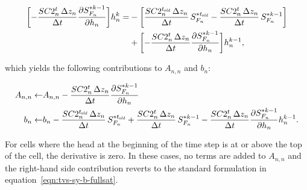 \begin{equation}
	\label{eqn:tvs-sy-nr}
	\begin{aligned}
		\biggl[ - \frac{SC2_n^t \, \Delta z_n}{\Delta t} \frac{\partial S_{F_n}^{\ast k-1}}{\partial h_n} \biggr] h_n^k =
		& - \biggl[ \frac{SC2_n^{t_\mathit{\kern -0.07em old}} \, \Delta z_n}{\Delta t} \, S_{F_n}^{\ast t_\mathit{\kern -0.07em old}} - \frac{SC2_n^t \, \Delta z_n}{\Delta t} \, S_{F_n}^{\ast k-1} \biggr] \\
		& + \biggl[ - \frac{SC2_n^t \, \Delta z_n}{\Delta t} \frac{\partial S_{F_n}^{\ast k-1}}{\partial h_n} \biggr] h_n^{k-1} ,
	\end{aligned}
\end{equation}

\noindent which yields the following contributions to $A_{n,n}$ and $b_n$:

\begin{equation}
	\label{eqn:tvs-sy-Ab-std}
	\begin{aligned}
		A_{n,n} \leftarrow & A_{n,n} - \frac{SC2_n^t \, \Delta z_n}{\Delta t} \frac{\partial S_{F_n}^{\ast k-1}}{\partial h_n} \\
		b_n \leftarrow & b_n - \frac{SC2_n^{t_\mathit{\kern -0.07em old}} \, \Delta z_n}{\Delta t} \, S_{F_n}^{\ast t_\mathit{\kern -0.07em old}} + \frac{SC2_n^t \, \Delta z_n}{\Delta t} \, S_{F_n}^{\ast k-1} - \frac{SC2_n^t \, \Delta z_n}{\Delta t} \frac{\partial S_{F_n}^{\ast k-1}}{\partial h_n} h_n^{k-1} .
	\end{aligned}
\end{equation}

\noindent For cells where the head at the beginning of the time step is at or above the top of the cell, the derivative is zero. In these cases, no terms are added to $A_{n,n}$ and the right-hand side contribution reverts to the standard formulation in equation~\ref{eqn:tvs-sy-b-fullsat}.
